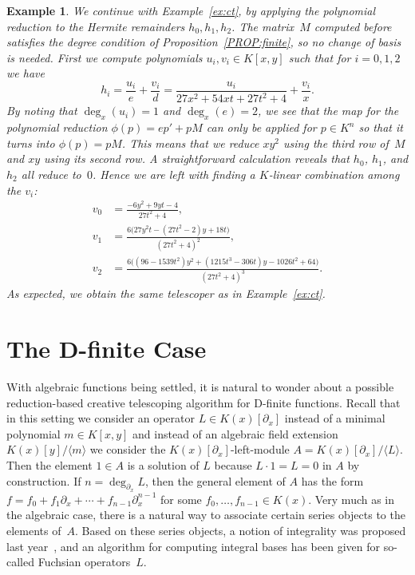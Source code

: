\documentclass{sig-alternate}
\newtheorem{example}[theorem]{Example}
\begin{document}
\begin{example}
We continue with Example~\ref{ex:ct}, by applying the polynomial reduction
to the Hermite remainders $h_0,h_1,h_2$. The matrix~$M$ computed before
satisfies the degree condition of Proposition~\ref{PROP:finite}, so no
change of basis is needed. First we compute polynomials
$u_i,v_i\in K[x,y]$ such that for $i=0,1,2$ we have
\[
  h_i = \frac{u_i}{e} + \frac{v_i}{d} = \frac{u_i}{27x^2+54xt+27t^2+4} + \frac{v_i}{x}.
\]
By noting that $\deg_x(u_i)=1$ and $\deg_x(e)=2$, we see that the
map for the polynomial reduction $\phi(p) = ep' + pM$ can only be
applied for $p\in K^n$ so that it turns into $\phi(p) = pM$.
This means that we reduce $xy^2$ using the third row of~$M$ and
$xy$ using its second row. A straightforward calculation reveals
that $h_0$, $h_1$, and $h_2$ all reduce to~$0$. Hence we are left
with finding a $K$-linear combination among the $v_i$:
\begin{align*}
 v_0 &= \frac{-6y^2+9yt-4}{27t^2+4},\\
 v_1 &= \frac{6\bigl(27y^2t-(27t^2-2)y+18t\bigr)}{(27t^2+4)^2},\\
 v_2 &= \frac{6\bigl((96-1539t^2)y^2+(1215t^3-306t)y-1026t^2+64\bigr)}{(27t^2+4)^3}.
\end{align*}
As expected, we obtain the same telescoper as in Example~\ref{ex:ct}.
\end{example}


\section{The D-finite Case}

With algebraic functions being settled, it is natural to wonder about a possible
reduction-based creative telescoping algorithm for D-finite functions. Recall
that in this setting we consider an operator $L\in K(x)[\partial_x]$ instead of a minimal
polynomial $m\in K[x,y]$ and instead of an algebraic field extension
$K(x)[y]/\langle m\rangle$ we consider the $K(x)[\partial_x]$-left-module
$A=K(x)[\partial_x]/\langle L\rangle$. Then the element $1\in A$ is a solution of $L$
because $L\cdot 1=L=0$ in $A$ by construction. If $n=\deg_{\partial_x}L$, then
the general element of $A$ has the form
$f=f_0+f_1\partial_x+\cdots+f_{n-1}\partial_x^{n-1}$ for some
$f_0,\dots,f_{n-1}\in K(x)$. Very much as in the algebraic case, there is a natural way
to associate certain series objects to the elements of~$A$. Based on these
series objects, a notion of integrality was proposed last year~\cite{kauers15b}, and an
algorithm for computing integral bases has been given for so-called Fuchsian
operators~$L$.
\end{document}
